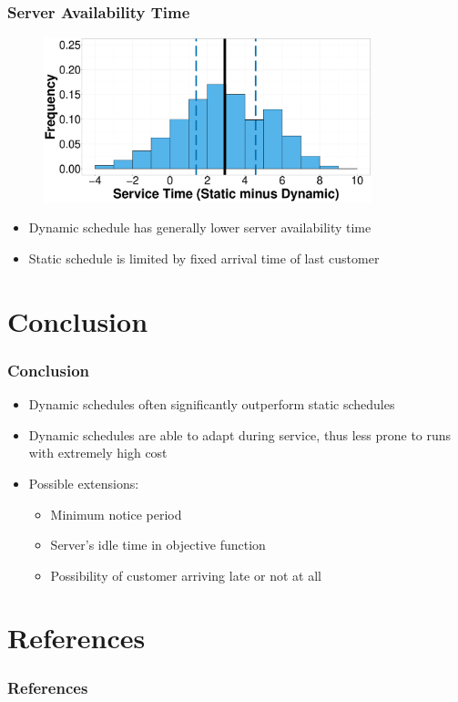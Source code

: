 \documentclass{beamer}
\begin{document}
\begin{frame}
	\frametitle{Server Availability Time}

	\begin{figure}
		\centering
		\includegraphics[width=0.85\textwidth]{TST_Hist_Diff.eps}
	\end{figure}

	\begin{itemize}
		\item Dynamic schedule has generally lower server availability time
		\item Static schedule is limited by fixed arrival time of last customer
	\end{itemize}
\end{frame}

\section{Conclusion}

\begin{frame}
	\frametitle{Conclusion}

	\begin{itemize}
		\item Dynamic schedules often significantly outperform static schedules
		\item Dynamic schedules are able to adapt during service, thus less prone to runs with extremely high cost
		\item Possible extensions:
		\begin{itemize}
			\item Minimum notice period
			\item Server's idle time in objective function
			\item Possibility of customer arriving late or not at all
		\end{itemize}
	\end{itemize}
\end{frame}

\appendix

\section{References}

\begin{frame}[allowframebreaks]
	\frametitle{References}
	\printbibliography[heading=none]
\end{frame}
\end{document}
